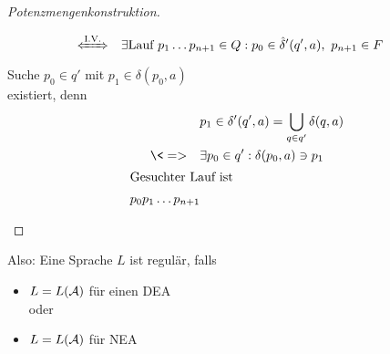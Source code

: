 \begin{proof}[Potenzmengenkonstruktion]
\begin{description}
\begin{align*}
                \xLeftrightarrow{\text{I.V.}}\quad& \exists \text{Lauf\ } p_1\dots p_{n+1}\in Q : p_0\in\hat\delta'(q', a),\ p_{n+1}\in F
        \end{align*}
        Suche $p_0\in q'$ mit $p_1\in\delta(p_0,a)$\\
        existiert, denn
        \begin{align*}
                & p_1\in \delta'(q', a) =  \bigcup_{q\in q'} \delta(q,a)\\
                \<=>\quad & \exists p_0\in q' : \delta(p_0,a) \ni p_1\\
                \shortintertext{Gesuchter Lauf ist}
                p_0p_1\dots p_{n+1}
        \end{align*}
        \end{description}
\end{proof}
Also: Eine Sprache $L$ ist regulär, falls
\begin{itemize}
\item $L = L(\mathcal{A})$ für einen \ac{DEA}\\
	oder
\item $L = L(\mathcal{A})$ für \ac{NEA}
\end{itemize}

